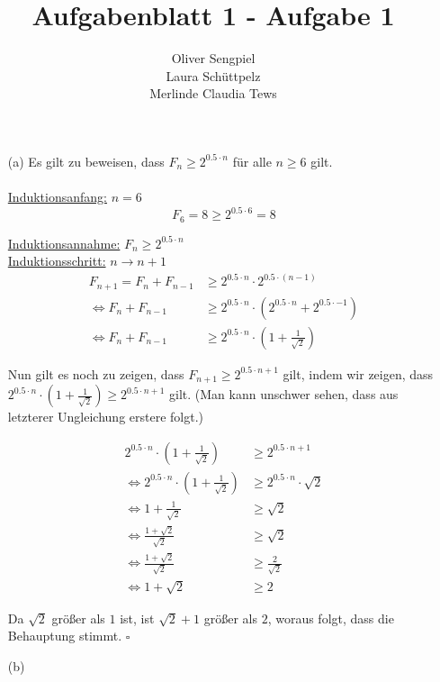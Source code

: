 \documentclass{article}
\title{Aufgabenblatt 1 - Aufgabe 1}
\author{Oliver Sengpiel \\
        Laura Schüttpelz \\
        Merlinde Claudia Tews}
\begin{document}
\maketitle

\begin{enumerate}
\item[(a)]
Es gilt zu beweisen, dass $F_n \geq 2^{0.5 \cdot n}$ für alle $n \geq 6$ gilt.\\
\\

\underline{Induktionsanfang:} \quad $n = 6$ \\
\begin{equation*}
F_6 = 8 \geq 2^{0.5 \cdot 6} = 8
\end{equation*}

\underline{Induktionsannahme:} \quad $F_n \geq 2^{0.5 \cdot n}$ \\

\underline{Induktionsschritt:} \quad $n \to n+1$ \\
\begin{align*}
F_{n+1} = F_{n} + F_{n-1} &\geq 2^{0.5 \cdot n} \cdot 2^{0.5 \cdot (n-1)} \\
\Leftrightarrow F_{n} + F_{n-1} &\geq 2^{0.5 \cdot n} \cdot \left( 2^{0.5 \cdot
n} + 2^{0.5 \cdot -1} \right) \\
\Leftrightarrow F_{n} + F_{n-1} &\geq 2^{0.5 \cdot n} \cdot \left( 1 +
\frac{1}{\sqrt{2}} \right)
\end{align*}

Nun gilt es noch zu zeigen, dass $F_{n+1} \geq 2^{0.5 \cdot n+1}$ gilt, indem
wir zeigen, dass $2^{0.5 \cdot n} \cdot \left( 1 + \frac{1}{\sqrt{2}} \right)
\geq 2^{0.5 \cdot n+1}$ gilt. (Man kann unschwer sehen, dass aus letzterer
Ungleichung erstere folgt.)

\begin{align*}
2^{0.5 \cdot n} \cdot \left( 1 + \frac{1}{\sqrt{2}} \right) &\geq 2^{0.5 \cdot
n+1} \\
\Leftrightarrow 2^{0.5 \cdot n} \cdot \left( 1 + \frac{1}{\sqrt{2}} \right)
&\geq 2^{0.5 \cdot n} \cdot \sqrt{2} \\
\Leftrightarrow 1 + \frac{1}{\sqrt{2}} &\geq \sqrt{2} \\
\Leftrightarrow \frac{1 + \sqrt{2}}{\sqrt{2}} &\geq \sqrt{2} \\
\Leftrightarrow \frac{1 + \sqrt{2}}{\sqrt{2}} &\geq \frac{2}{\sqrt{2}} \\
\Leftrightarrow 1 + \sqrt{2} &\geq 2
\end{align*}

Da $\sqrt{2}$ größer als $1$ ist, ist $\sqrt{2}+1$ größer als $2$, woraus folgt,
dass die Behauptung stimmt. \quad $\square$
\item[(b)]


\end{enumerate}
\end{document}
